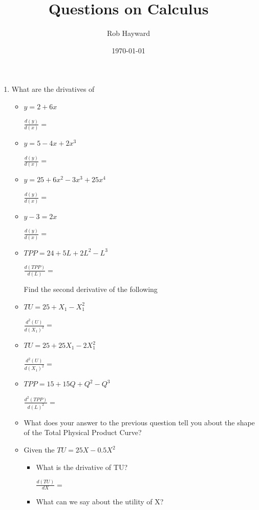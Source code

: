 \documentclass[12pt, a4paper, oneside]{article}\usepackage[]{graphicx}\usepackage[]{color}
\begin{document}
\title{Questions on Calculus}
\author{Rob Hayward} 
\date{\today}
\maketitle

\doublespacing
\begin{enumerate}


\item What are the drivatives of
\begin{itemize}
\item $y = 2 + 6x$

$\frac{d(y)}{d(x)} = $

\item $y = 5 - 4x +2x^3$

$\frac{d(y)}{d(x)} = $

\item $y = 25 +6x^2 - 3x^3 +25x^4$

$\frac{d(y)}{d(x)} = $

\item $y - 3 = 2x$

$\frac{d(y)}{d(x)} = $

\item $TPP = 24 +5L +2L^2 - L^3$

$\frac{d(TPP)}{d(L)} = $

Find the second derivative of the following

\item $TU = 25 + X_1 - X_1^2$

$\frac{d^2(U)}{d(X_1)^2} = $

\item $TU = 25 +25X_1 -2X_1^2$

$\frac{d^2(U)}{d(X_1)^2} = $

\item $TPP = 15 +15Q +Q^2 - Q^3$

$\frac{d^2(TPP)}{d(L)^2} = $

\item What does your answer to the previous question tell you about the shape of the Total Physical Product Curve? 


\item Given the $TU = 25X - 0.5X^2$
\begin{itemize}
\item What is the drivative of TU?

$\frac{d(TU)}{{dX}} = $

\item What can we say about the utility of X?




\end{itemize}
\end{itemize}
\end{enumerate}
\end{document}
